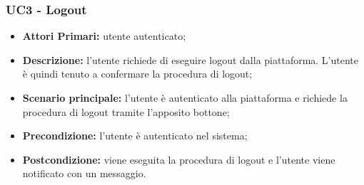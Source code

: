 \subsubsection{UC3 - Logout}
\begin{itemize}
	\item \textbf{Attori Primari:} utente autenticato;
	\item \textbf{Descrizione:} l'utente richiede di eseguire logout dalla piattaforma. L'utente è quindi tenuto a confermare la procedura di logout;
	\item \textbf{Scenario principale:} l'utente è autenticato alla piattaforma e richiede la procedura di logout tramite l'apposito bottone;
	\item \textbf{Precondizione:} l'utente è autenticato nel sistema;
	\item \textbf{Postcondizione:} viene eseguita la procedura di logout e l'utente viene notificato con un messaggio.
\end{itemize}